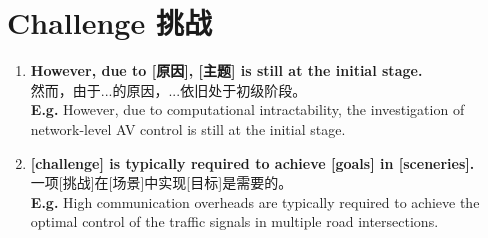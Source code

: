 \chapter{Challenge 挑战}


\begin{enumerate}

    \item \textbf{However, due to [原因], [主题] is still at the initial stage.} \\ 然而，由于...的原因，...依旧处于初级阶段。  
    \\ \textbf{E.g.} However, due to computational intractability, the investigation of network-level AV control is still at the initial stage.
    
    \item \textbf{[challenge] is typically required to achieve [goals] in [sceneries].} 
    \\ 一项[挑战]在[场景]中实现[目标]是需要的。
    \\ \textbf{E.g.} High communication overheads are typically required to achieve the optimal control of the traffic signals in multiple road intersections.
    

    
    
\end{enumerate}
